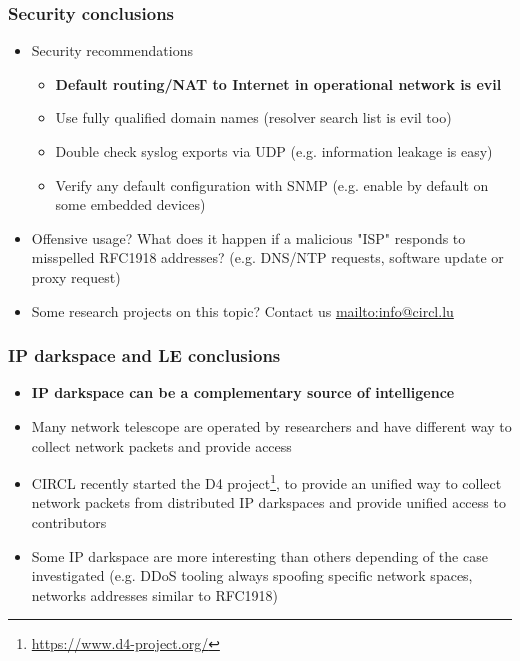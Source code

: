 \documentclass{beamer}
\begin{document}
\begin{frame}
        \frametitle{Security conclusions}
\begin{itemize}
   \item Security recommendations
\begin{itemize}
    \item \textbf{Default routing/NAT to Internet in operational network is evil}
    \item Use fully qualified domain names (resolver search list is evil too)
    \item Double check syslog exports via UDP (e.g. information leakage is easy)
    \item Verify any default configuration with SNMP (e.g. enable by default on some embedded devices)
\end{itemize}
   \item Offensive usage? What does it happen if a malicious "ISP" responds to misspelled RFC1918 addresses? (e.g. DNS/NTP requests, software update or proxy request)
   \item Some research projects on this topic? Contact us \url{mailto:info@circl.lu}
\end{itemize}
\end{frame}

\begin{frame}
        \frametitle{IP darkspace and LE conclusions}
        \begin{itemize}
                \item \textbf{IP darkspace can be a complementary source of intelligence}
                \item Many network telescope are operated by researchers and have different way to collect network packets and provide access
                \item CIRCL recently started the D4 project\footnote{\url{https://www.d4-project.org/}}, to provide an unified way to collect network packets from distributed IP darkspaces and provide unified access to contributors
                \item Some IP darkspace are more interesting than others depending of the case investigated (e.g. DDoS tooling always spoofing specific network spaces, networks addresses similar to RFC1918)
        \end{itemize}

\end{frame}
\end{document}
